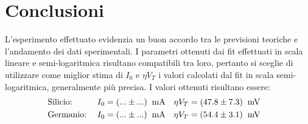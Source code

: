 \documentclass[@SRC@/main]{subfiles}
\begin{document}
    \section{Conclusioni} \label{sec:conclusioni}

    L'esperimento effettuato evidenzia un buon accordo tra le previsioni teoriche e l'andamento dei dati sperimentali. I
    parametri ottenuti dai fit effettuati in scala lineare e semi-logaritmica risultano compatibili tra loro, pertanto si
    sceglie di utilizzare come miglior stima di $I_{0}$ e $\eta V_{T}$ i valori calcolati dal fit in scala semi-logaritmica,
    generalmente più precisa. \newline\newline
    I valori ottenuti risultano essere:
    \begin{align*}
        &\textnormal{Silicio:} \;
        &I_{0} &= (... \pm ...) \;\;\textnormal{mA} &
        \eta V_{T} &= (47.8 \pm 7.3)\;\;\textnormal{mV} & \\
        &\textnormal{Germanio:} \;
        &I_{0} &= (... \pm ...) \;\;\textnormal{mA} &
        \eta V_{T} &= (54.4 \pm 3.1)\;\;\textnormal{mV} &
    \end{align*}
\end{document}
